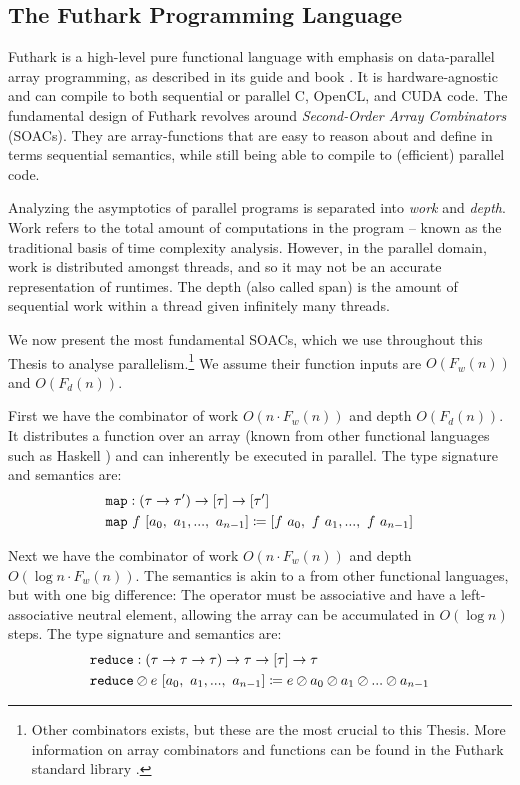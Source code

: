 \subsection{The Futhark Programming Language}
\label{subsec:futhark}

Futhark is a high-level pure functional language with emphasis on data-parallel
array programming, as described in its guide and book
\cite{futguide,ParallelProgrammingInFuthark}. It is hardware-agnostic and can
compile to both sequential or parallel C, OpenCL, and CUDA code. The fundamental
design of Futhark revolves around \textit{Second-Order Array Combinators}
(SOACs). They are array-functions that are easy to reason about and define in
terms sequential semantics, while still being able to compile to (efficient)
parallel code.

Analyzing the asymptotics of parallel programs is separated into \textit{work}
and \textit{depth}. Work refers to the total amount of computations in the
program -- known as the traditional basis of time complexity analysis. However,
in the parallel domain, work is distributed amongst threads, and so it may not
be an accurate representation of runtimes. The depth (also called span) is the
amount of sequential work within a thread given infinitely many threads.

We now present the most fundamental SOACs, which we use throughout this Thesis
to analyse parallelism.\footnote{Other combinators exists, but these are the
  most crucial to this Thesis. More information on array combinators and
  functions can be found in the Futhark standard library \cite{futprelude}.} We
assume their function inputs are $O(F_{w}(n))$ and $O(F_d(n))$.

First we have the combinator  of work $O(n\cdot F_w(n))$ and depth
$O(F_d(n))$. It distributes a function over an array (known from other
functional languages such as Haskell \cite{marlow2010haskell}) and can
inherently be executed in parallel. The type signature and semantics are:
\begin{align}
  &\mathtt{map}:(\tau \to \tau') \to \mathtt{[}\tau\mathtt{]} \to \mathtt{[}\tau'\mathtt{]}\\
  &\mathtt{map}~f~[a_0,~a_1,...,~a_{n-1}] \coloneq [f~a_0,~f~a_1,...,~f~a_{n-1}]
\end{align}

Next we have the combinator  of work $O(n\cdot F_w(n))$ and depth
$O(\log n \cdot F_w(n))$.  The semantics is akin to a  from other
functional languages, but with one big difference: The operator must be
associative and have a left-associative neutral element, allowing the array can
be accumulated in $O(\log n)$ steps. The type signature and semantics are:
\begin{align}
  &\mathtt{reduce}:(\tau \to \tau \to \tau) \to \tau \to \mathtt{[}\tau\mathtt{]} \to \tau\\
  & \mathtt{reduce} \oslash e~[a_0,~a_1,...,~a_{n-1}] \coloneq e \oslash a_0 \oslash a_1 \oslash ...\oslash a_{n-1}
\end{align}

